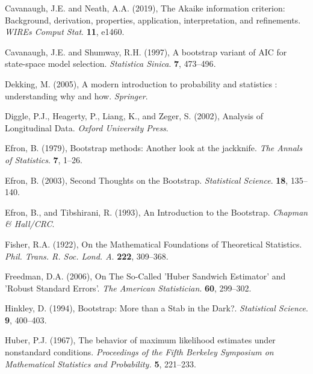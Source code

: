 \phantom{a}

\rff Cavanaugh, J.E. and Neath, A.A. (2019),
      The Akaike information criterion: Background, derivation, properties, application, interpretation, and refinements.
      {\it WIREs Comput Stat}.
      {\bf 11}, {e1460}.

\phantom{a}

\rff Cavanaugh, J.E. and Shumway, R.H. (1997),
      A bootstrap variant of AIC for state-space model selection.
      {\it Statistica Sinica}.
      {\bf 7}, {473--496}.

\phantom{a}

\rff Dekking, M. (2005),
      A modern introduction to probability and statistics : understanding why and how.
      {\it Springer}.

\phantom{a}

\rff Diggle, P.J., Heagerty, P., Liang, K., and Zeger, S.  (2002),
      Analysis of Longitudinal Data.
      {\it Oxford University Press}.

\phantom{a}

\rff Efron, B. (1979),
      Bootstrap methods: Another look at the jackknife.
      {\it The Annals of Statistics}.
      {\bf 7}, {1--26}.

\phantom{a}

\rff Efron, B. (2003),
      Second Thoughts on the Bootstrap.
      {\it Statistical Science}.
      {\bf 18}, {135--140}.

\phantom{a}

\rff Efron, B., and Tibshirani, R. (1993),
      An Introduction to the Bootstrap.
      {\it Chapman \& Hall/CRC}.

\phantom{a}

\rff Fisher, R.A. (1922),
      On the Mathematical Foundations of Theoretical Statistics.
      {\it Phil. Trans. R. Soc. Lond. A}.
      {\bf 222}, {309--368}.

\phantom{a}

\rff Freedman, D.A. (2006),
      On The So-Called 'Huber Sandwich Estimator' and 'Robust Standard Errors'.
      {\it The American Statistician}.
      {\bf 60}, {299--302}.

\phantom{a}

\rff Hinkley, D. (1994),
      Bootstrap: More than a Stab in the Dark?.
      {\it Statistical Science}.
      {\bf 9}, {400--403}.

\phantom{a}

\rff Huber, P.J. (1967),
    The behavior of maximum likelihood estimates under nonstandard conditions.
    {\it Proceedings of the Fifth Berkeley Symposium on Mathematical Statistics and Probability.}
    {\bf 5}, {221--233}.

